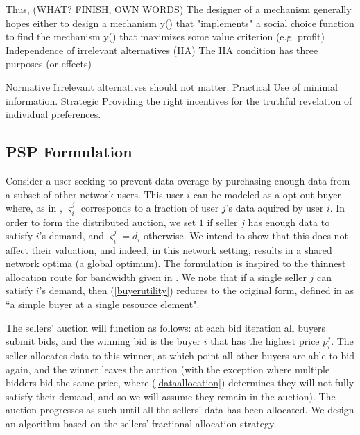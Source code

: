 \documentclass[12pt]{article}
\theoremstyle{definition}
\newcommand{\vs}{\varsigma}
\begin{document}
\begin{multicols}{2}
Thus, (WHAT? FINISH, OWN WORDS)
The designer of a mechanism generally hopes either to design a mechanism
y() that "implements" a social choice function to find the
mechanism y() that maximizes some value criterion (e.g. profit)
Independence of irrelevant alternatives (IIA)
The IIA condition has three purposes (or effects)

Normative
Irrelevant alternatives should not matter.
Practical
Use of minimal information.
Strategic
Providing the right incentives for the truthful revelation of individual
preferences. 

\subsection{PSP Formulation}
Consider a user seeking to prevent
data overage by purchasing enough data from a subset of other network users.
This user $i$ can be modeled as a opt-out buyer where, as in \cite{semret},
$\vs_i^j$ corresponds to a fraction of user $j$'s data aquired by user $i$. In order to form the
distributed auction, we set $1$ if seller $j$ has enough data to
satisfy $i$'s demand, and $\vs_i^j=d_i$ otherwise. We intend to show that this
does not affect their valuation, and indeed, in this network setting, results in a shared network optima (a
global optimum). The formulation is inspired to the thinnest allocation route for
bandwidth given in \cite{lazar}. We note that if a single seller $j$ can
satisfy $i$'s demand, then
(\ref{buyerutility}) reduces to the original form, defined in
\cite{semret} as ``a simple buyer at a single resource element".

The sellers' auction will function as follows: at each bid iteration all buyers
submit bids, and the winning bid is the buyer $i$ that has the highest price
$p_i^j$. The seller allocates
data to this winner, at which point all other buyers are able to bid again, and
the winner leaves the auction (with the exception where multiple bidders bid
the same price, where (\ref{dataallocation}) determines they will not fully
satisfy their demand, and so we will assume they remain in the auction). The auction progresses as such until all the
sellers' data has been allocated. We design an algorithm based on the sellers'
fractional allocation strategy.


\end{multicols}
\end{document}
